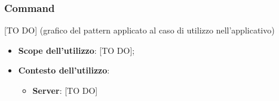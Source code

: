 	\subsubsection{Command} %
	\label{ssub:command}
	[TO DO] (grafico del pattern applicato al caso di utilizzo nell'applicativo)
		\begin{itemize}
			\item \textbf{Scope dell'utilizzo}: [TO DO];
			\item \textbf{Contesto dell'utilizzo}:
				\begin{itemize}
					\item \textbf{Server}: [TO DO]
				\end{itemize}
		\end{itemize}
